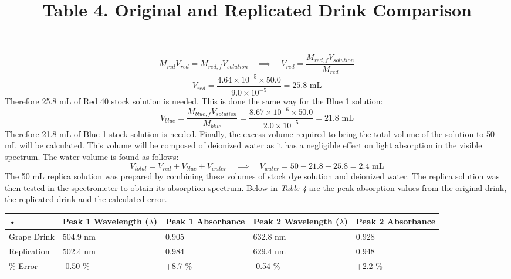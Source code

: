\documentclass[12pt]{article}
\begin{document}
\begin{equation}
M_{red}V_{red} = M_{red,f}V_{solution} \hspace{12pt}\implies\hspace{12pt} V_{red} = \frac{M_{red,f}V_{solution}}{M_{red}}
\end{equation}
\begin{equation}
V_{red} = \frac{4.64 \times 10^{-5} \times 50.0 }{9.0 \times 10^{-5}} = \text{25.8 mL}
\end{equation}
Therefore 25.8 mL of Red 40 stock solution is needed. This is done the same way for the Blue 1 solution:
\begin{equation}
V_{blue} = \frac{M_{blue,f}V_{solution}}{M_{blue}} = \frac{8.67 \times 10^{-6} \times 50.0 }{2.0 \times 10^{-5}} = \text{21.8 mL}
\end{equation}
Therefore 21.8 mL of Blue 1 stock solution is needed. Finally, the excess volume required to bring the total volume of the solution to 50 mL will be calculated. This volume will be composed of deionized water as it has a negligible effect on light absorption in the visible spectrum. The water volume is found as follows:
\begin{equation}
V_{total} = V_{red} + V_{blue} + V_{water} \hspace{12pt}\implies\hspace{12pt} V_{water} = 50 - 21.8 - 25.8 = \text{2.4 mL}
\end{equation} 
The 50 mL replica solution was prepared by combining these volumes of stock dye solution and deionized water. The replica solution was then tested in the spectrometer to obtain its absorption spectrum. Below in \textit{Table 4} are the peak absorption values from the original drink, the replicated drink and the calculated error.\\
\renewcommand*{\arraystretch}{1.5}
\title{\textbf{Table 4.} Original and Replicated Drink Comparison}\vspace{-6pt}
\begin{center}
\begin{tabular}{|L|L|L|L|L|}
\hline 
• &Peak 1 Wavelength ($\lambda$) & Peak 1 Absorbance &Peak 2 Wavelength ($\lambda$) &Peak 2 Absorbance \\ 
\hline 
Grape Drink & 504.9 nm & 0.905 & 632.8  nm & 0.928 \\ 
\hline 
Replication & 502.4 nm & 0.984 & 629.4  nm& 0.948 \\ 
\hline 
\% Error & -0.50 \% & +8.7 \% & -0.54 \% & +2.2 \%\\ 
\hline 
\end{tabular} 
\end{center}
\end{document}
